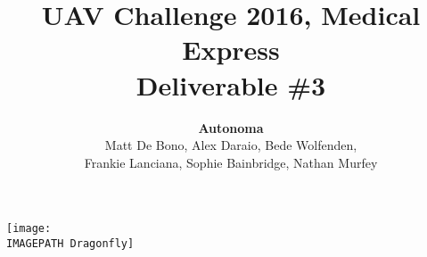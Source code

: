 \documentclass{article}
\title{UAV Challenge 2016, Medical Express\\ Deliverable \#3\\}
\author{
	\textbf{Autonoma}\\
	Matt De Bono,
	Alex Daraio,
	Bede Wolfenden,\\
	Frankie Lanciana,
	Sophie Bainbridge,
	Nathan Murfey}
\newcommand{\IMAGEPATH}{../Images/}
\begin{document}
\maketitle

\vspace{100pt}
\begin{center}
	\texttt{[image: \\IMAGEPATH Dragonfly]}
\end{center}


\clearpage

\tableofcontents
\end{document}
